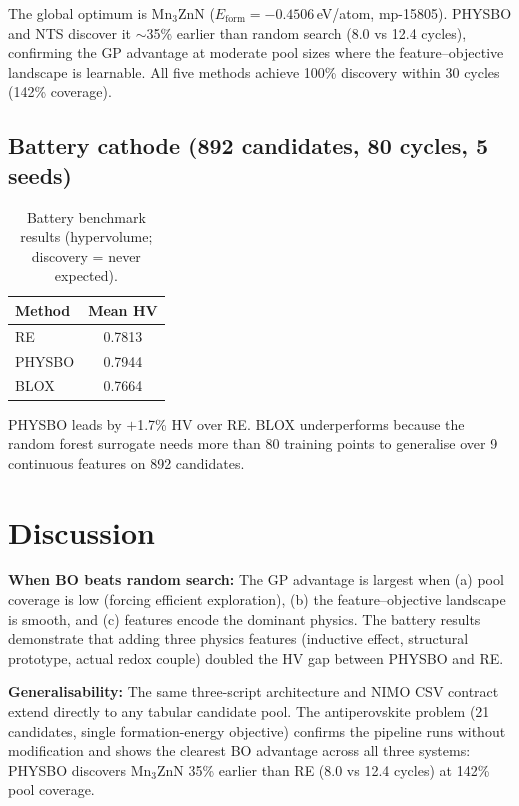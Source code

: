 \documentclass[10pt,twocolumn]{article}
\begin{document}
The global optimum is Mn$_3$ZnN ($E_\text{form} = -0.4506$\,eV/atom, mp-15805).
PHYSBO and NTS discover it $\sim$35\% earlier than random search (8.0 vs 12.4
cycles), confirming the GP advantage at moderate pool sizes where the
feature--objective landscape is learnable.
All five methods achieve 100\% discovery within 30 cycles (142\% coverage).

\subsection{Battery cathode (892 candidates, 80 cycles, 5 seeds)}

\begin{table}[h]
\centering
\caption{Battery benchmark results (hypervolume; discovery = never expected).}
\label{tab:battery}
\begin{tabular}{lc}
\toprule
Method & Mean HV \\
\midrule
RE     & 0.7813 \\
PHYSBO & 0.7944 \\
BLOX   & 0.7664 \\
\bottomrule
\end{tabular}
\end{table}

PHYSBO leads by $+$1.7\% HV over RE.
BLOX underperforms because the random forest surrogate needs more than 80
training points to generalise over 9 continuous features on 892 candidates.

\section{Discussion}

\textbf{When BO beats random search:}
The GP advantage is largest when (a) pool coverage is low (forcing efficient
exploration), (b) the feature--objective landscape is smooth, and (c) features
encode the dominant physics.
The battery results demonstrate that adding three physics features (inductive
effect, structural prototype, actual redox couple) doubled the HV gap between
PHYSBO and RE.

\textbf{Generalisability:}
The same three-script architecture and NIMO CSV contract extend directly to any
tabular candidate pool.
The antiperovskite problem (21 candidates, single formation-energy objective)
confirms the pipeline runs without modification and shows the clearest BO
advantage across all three systems: PHYSBO discovers Mn$_3$ZnN 35\% earlier
than RE (8.0 vs 12.4 cycles) at 142\% pool coverage.
\end{document}
